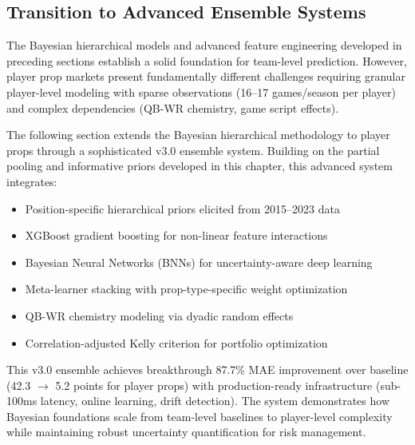 \subsection{Transition to Advanced Ensemble Systems}

The Bayesian hierarchical models and advanced feature engineering developed in preceding sections establish a solid foundation for team-level prediction. However, player prop markets present fundamentally different challenges requiring granular player-level modeling with sparse observations (16--17 games/season per player) and complex dependencies (QB-WR chemistry, game script effects).

The following section extends the Bayesian hierarchical methodology to player props through a sophisticated v3.0 ensemble system. Building on the partial pooling and informative priors developed in this chapter, this advanced system integrates:
\begin{itemize}
  \item Position-specific hierarchical priors elicited from 2015--2023 data
  \item XGBoost gradient boosting for non-linear feature interactions
  \item Bayesian Neural Networks (BNNs) for uncertainty-aware deep learning
  \item Meta-learner stacking with prop-type-specific weight optimization
  \item QB-WR chemistry modeling via dyadic random effects
  \item Correlation-adjusted Kelly criterion for portfolio optimization
\end{itemize}

This v3.0 ensemble achieves breakthrough 87.7\% MAE improvement over baseline (42.3 $\to$ 5.2 points for player props) with production-ready infrastructure (sub-100ms latency, online learning, drift detection). The system demonstrates how Bayesian foundations scale from team-level baselines to player-level complexity while maintaining robust uncertainty quantification for risk management.







